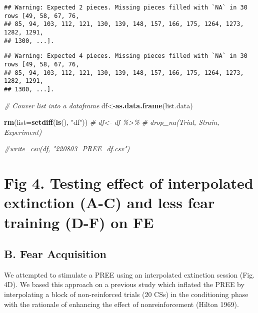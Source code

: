 \documentclass[
]{article}
\newenvironment{Shaded}{\begin{snugshade}}{\end{snugshade}}
\newcommand{\AttributeTok}[1]{\textcolor[rgb]{0.13,0.29,0.53}{#1}}
\newcommand{\CommentTok}[1]{\textcolor[rgb]{0.56,0.35,0.01}{\textit{#1}}}
\newcommand{\FunctionTok}[1]{\textcolor[rgb]{0.13,0.29,0.53}{\textbf{#1}}}
\newcommand{\NormalTok}[1]{#1}
\newcommand{\OtherTok}[1]{\textcolor[rgb]{0.56,0.35,0.01}{#1}}
\newcommand{\StringTok}[1]{\textcolor[rgb]{0.31,0.60,0.02}{#1}}
\begin{document}
\begin{verbatim}
## Warning: Expected 2 pieces. Missing pieces filled with `NA` in 30 rows [49, 58, 67, 76,
## 85, 94, 103, 112, 121, 130, 139, 148, 157, 166, 175, 1264, 1273, 1282, 1291,
## 1300, ...].
\end{verbatim}

\begin{verbatim}
## Warning: Expected 4 pieces. Missing pieces filled with `NA` in 30 rows [49, 58, 67, 76,
## 85, 94, 103, 112, 121, 130, 139, 148, 157, 166, 175, 1264, 1273, 1282, 1291,
## 1300, ...].
\end{verbatim}

\begin{Shaded}
\begin{Highlighting}[]
\CommentTok{\# Conver list into a dataframe}
\NormalTok{df}\OtherTok{\textless{}{-}}\FunctionTok{as.data.frame}\NormalTok{(list.data)}

\FunctionTok{rm}\NormalTok{(}\AttributeTok{list=}\FunctionTok{setdiff}\NormalTok{(}\FunctionTok{ls}\NormalTok{(), }\StringTok{"df"}\NormalTok{))}
\CommentTok{\# df\textless{}{-} df \%\textgreater{}\% }
\CommentTok{\#   drop\_na(Trial, Strain, Experiment)  }

\CommentTok{\#write\_csv(df, "220803\_PREE\_df.csv")}
\end{Highlighting}
\end{Shaded}

\hypertarget{fig-4.-testing-effect-of-interpolated-extinction-a-c-and-less-fear-training-d-f-on-fe}{%
\section{Fig 4. Testing effect of interpolated extinction (A-C) and less
fear training (D-F) on
FE}\label{fig-4.-testing-effect-of-interpolated-extinction-a-c-and-less-fear-training-d-f-on-fe}}

\hypertarget{b.-fear-acquisition}{%
\subsection{B. Fear Acquisition}\label{b.-fear-acquisition}}

We attempted to stimulate a PREE using an interpolated extinction
session (Fig. 4D). We based this approach on a previous study which
inflated the PREE by interpolating a block of non-reinforced trials (20
CSs) in the conditioning phase with the rationale of enhancing the
effect of nonreinforcement (Hilton 1969).
\end{document}
